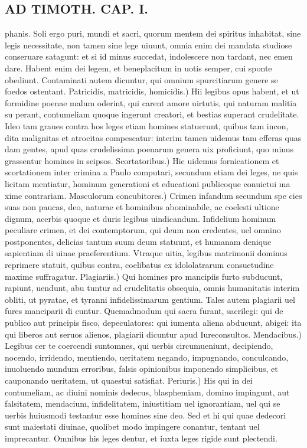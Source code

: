 \documentclass{article}
\begin{document}
\begin{pages}
\section*{AD TIMOTH. CAP. I. }
\marginpar{[ p.471 ]}\pstart phanis. Soli ergo puri, mundi et sacri, quorum mentem dei spiritus inhabitat, sine legis necessitate, non tamen sine lege uiuunt, omnia enim dei mandata studiose conseruare satagunt: et si id minus succedat, indolescere non tardant, nec emen dare. Habent enim dei legem, et beneplacitum in uotis semper, cui sponte obediunt. Contaminati autem dicuntur, qui omnium spurcitiarum genere se foedos ostentant. Patricidis, matricidis, homicidis.) Hii legibus opus habent, et ut formidine poenae malum oderint, qui carent amore uirtutis, qui naturam malitia su perant, contumeliam quoque ingerunt creatori, et bestias superant crudelitate. Ideo tam graues contra hos leges etiam homines statuerunt, quibus tam incon, dita malignitas et atrocitas compescatur: interim tamen uidemus tam efferas quas dam gentes, apud quas crudelissima poenarum genera uix proficiunt, quo minus grassentur homines in seipsos. Scortatoribus.) Hic uidemus fornicationem et scortationem inter crimina a Paulo computari, secundum etiam dei leges, ne quis licitam mentiatur, hominum generationi et educationi publicoque conuictui ma xime contrariam. Masculorum concubitores.) Crimen infandum secundum spe cies suas non paucas, deo, naturae et hominibus abominabile, ac coelesti ultione dignum, acerbis quoque et duris legibus uindicandum. Infidelium hominum peculiare crimen, et dei contemptorum, qui deum non credentes, uel omnino postponentes, delicias tantum suum deum statuunt, et humanam denique sapientiam di uinae praeferentium. Vtraque uitia, legibus matrimonii dominus reprimere statuit, quibus contra, coelibatus ex idololatrarum consuetudine maxime suffragatur. Plagiariis.) Qui homines pro mancipiis furto subducunt, rapiunt, uendunt, abu tuntur ad crudelitatis obsequia, omnis humanitatis interim obliti, ut pyratae, et tyranni infidelissimarum gentium. Tales autem plagiarii uel fures manciparii di cuntur. Quemadmodum qui sacra furant, sacrilegi: qui de publico aut principis fisco, depeculatores: qui iumenta aliena abducunt, abigei: ita qui liberos aut seruos alienos, plagiarii dicuntur apud Iureconsultos. Mendacibus.) Legibus cer te coercendi suntomnes, qui uerbis circumueniunt, decipiendo, nocendo, irridendo, mentiendo, ueritatem negando, impugnando, conculcando, inuoluendo mundum erroribus, falsis opinionibus imponendo simplicibus, et cauponando ueritatem, ut quaestui satisfiat. Periuris.) His qui in dei contumeliam, ac diuini nominis dedecus, blasphemiam, domino impingunt, aut falsitatem, mendacium, infidelitatem, iniustitiam uel ignorantiam, uel qui se uerbis huiusmodi testantur esse homines sine deo. Sed et hi qui quae dedecori sunt maiestati diuinae, quolibet modo impingere conantur, tentant uel imprecantur. Omnibus his leges dentur, et iuxta leges rigide sunt plectendi.  \pend
{}
{}

\end{pages}
\end{document}
